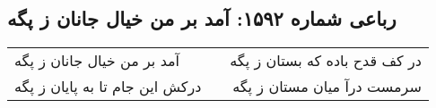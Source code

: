 \begin{center}
\section*{رباعی شماره ۱۵۹۲: آمد بر من خیال جانان ز پگه}
\label{sec:1592}
\begin{longtable}{l p{0.5cm} r}
آمد بر من خیال جانان ز پگه
&&
در کف قدح باده که بستان ز پگه
\\
درکش این جام تا به پایان ز پگه
&&
سرمست درآ میان مستان ز پگه
\\
\end{longtable}
\end{center}
